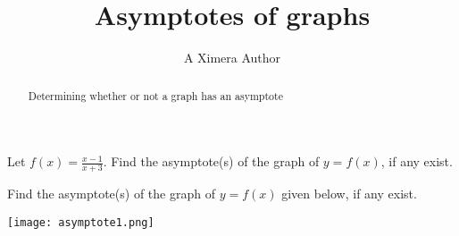 \documentclass{ximera}
\title{Asymptotes of graphs}
\author{A Ximera Author}
\begin{document}
\begin{abstract}
Determining whether or not a graph has an asymptote
\end{abstract}

\maketitle

\begin{problem}
Let $f(x) = \frac{x - 1}{x + 3}$.  Find the asymptote(s) of the graph of $y = f(x)$, if any exist.
\begin{selectAll}
\end{selectAll}
\end{problem}



\begin{problem}
Find the asymptote(s) of the graph of $y = f(x)$ given below, if any exist.
\begin{image}
\texttt{[image: asymptote1.png]}
\end{image}
\begin{selectAll}
\end{selectAll}
\end{problem}
\end{document}
